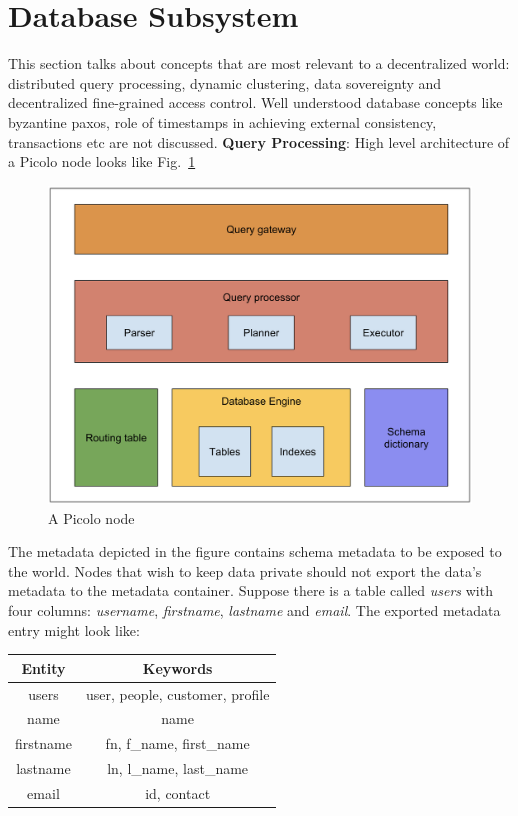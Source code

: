 \documentclass[preprint,10pt]{elsarticle}
\newcommand{\fscale}[1]{#1\linewidth}
\newcommand{\figref}[1]{Fig.~\ref{#1}}
\begin{document}
\section{Database Subsystem}
This section talks about concepts that are most relevant to a decentralized world: distributed query processing, dynamic clustering, data sovereignty and decentralized fine-grained access control. Well understood database concepts like byzantine paxos, role of timestamps in achieving external consistency, transactions etc are not discussed.
\newline
\newline
\textbf{Query Processing}: High level architecture of a Picolo node looks like \figref{fig:node_arch}
\begin{figure}[h!] \centering
	\includegraphics[width=\fscale{1}]{node_arch.png}
	\caption{A Picolo node}
	\label{fig:node_arch}
\end{figure}
The metadata depicted in the figure contains schema metadata to be exposed to the world. Nodes that wish to keep data private should not export the data's metadata to the metadata container. Suppose there is a table called \textit{users} with four columns: \textit{username}, \textit{firstname}, \textit{lastname} and \textit{email}. The exported metadata entry might look like:
\begin{center}
	\begin{tabular}{| c | c |} 
		\hline
		Entity & Keywords \\ [0.5ex] 
		\hline
		users & user, people, customer, profile\\ 
		\hline
		name & name \\
		\hline
		firstname & fn, {f\_name}, {first\_name} \\
		\hline
		lastname & ln, {l\_name}, {last\_name} \\
		\hline
		email & id, contact \\ [1ex] 
		\hline
	\end{tabular}
\end{center}
\end{document}
